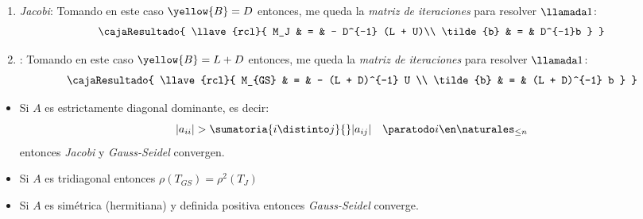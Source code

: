 \begin{enumerate}[label=\tiny\purple{\faIcon{snowman}}]
        \begin{enumerate}[label=\tiny\violet{\faIcon{pray})}]

          \item \textit{Jacobi}: Tomando en este caso $\yellow{B} = D$
                entonces, me queda la \textit{matriz de iteraciones} para resolver $\llamada1$:
                $$
                  \cajaResultado{
                    \llave{rcl}{
                      M_J & = & - D^{-1} (L + U)\\
                      \tilde{b}   & = & D^{-1}b
                    }
                  }
                $$

          \item {}: Tomando en este caso $\yellow{B} = L + D$
                entonces, me queda la \textit{matriz de iteraciones} para resolver $\llamada1$:
                $$
                  \cajaResultado{
                    \llave{rcl}{
                      M_{GS} & = & - (L + D)^{-1} U \\
                      \tilde{b} & = & (L + D)^{-1} b
                    }
                  }
                $$
        \end{enumerate}

        \begin{itemize}
          \item Si $A$ es estrictamente diagonal dominante, es decir:
                $$
                  |a_{ii}| > \sumatoria{i \distinto j}{} |a_{ij}| \quad \paratodo i \en \naturales_{\leq n}
                $$
                entonces \textit{Jacobi} y \textit{Gauss-Seidel} convergen.

          \item Si $A$ es tridiagonal entonces $\rho(T_{GS}) = \rho^2(T_{J})$

          \item Si $A$ es simétrica (hermitiana) y definida positiva entonces \textit{Gauss-Seidel} converge.
        \end{itemize}

\end{enumerate}
